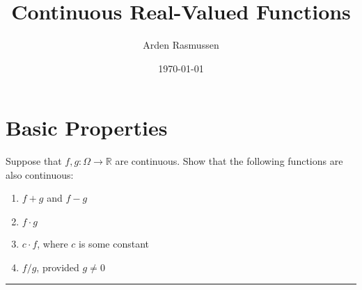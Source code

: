 \documentclass[12pt]{amsart}
\title{Continuous Real-Valued Functions}
\author{Arden Rasmussen}
\date{\today}
\newcommand{\sep}[1]{\noindent\rule{\textwidth}{#1pt}}
\newcommand{\R}{\mathbb{R}}
\begin{document}
\maketitle
\section{Basic Properties}%
\label{sec:Basic Properties}

Suppose that $f,g:\Omega\rightarrow\R$ are continuous. Show that the following
functions are also continuous:

\begin{enumerate}[label=(\alph*)]
  \item $f+g$ and $f-g$
  \item $f \cdot g$
  \item $c \cdot f$, where $c$ is some constant
  \item $f/g$, provided $g \neq 0$
\end{enumerate}

\sep{2}

\subsection{}%
\label{sub:1a}
\end{document}

